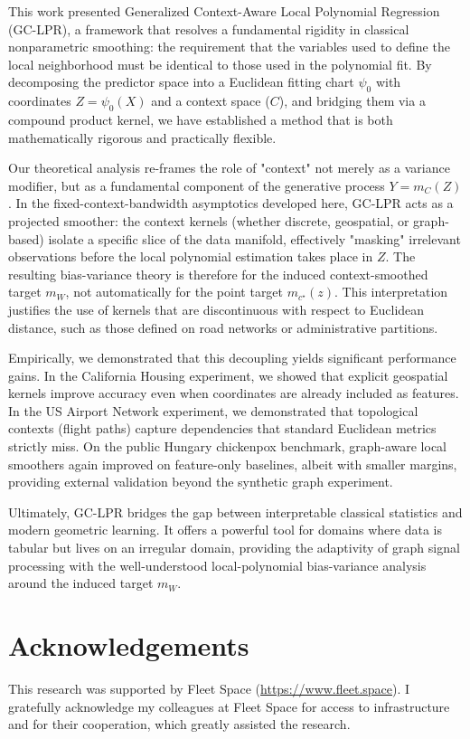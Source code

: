 \documentclass[final,1p,times,authoryear]{elsarticle}
\begin{document}
This work presented Generalized Context-Aware Local Polynomial Regression (GC-LPR), a framework that resolves a fundamental rigidity in classical nonparametric smoothing: the requirement that the variables used to define the local neighborhood must be identical to those used in the polynomial fit. By decomposing the predictor space into a Euclidean fitting chart $\psi_0$ with coordinates $Z=\psi_0(X)$ and a context space ($C$), and bridging them via a compound product kernel, we have established a method that is both mathematically rigorous and practically flexible.

Our theoretical analysis re-frames the role of "context" not merely as a variance modifier, but as a fundamental component of the generative process $Y = m_C(Z)$. In the fixed-context-bandwidth asymptotics developed here, GC-LPR acts as a projected smoother: the context kernels (whether discrete, geospatial, or graph-based) isolate a specific slice of the data manifold, effectively "masking" irrelevant observations before the local polynomial estimation takes place in $Z$. The resulting bias-variance theory is therefore for the induced context-smoothed target $m_W$, not automatically for the point target $m_{c^\star}(z)$. This interpretation justifies the use of kernels that are discontinuous with respect to Euclidean distance, such as those defined on road networks or administrative partitions.

Empirically, we demonstrated that this decoupling yields significant performance gains. In the California Housing experiment, we showed that explicit geospatial kernels improve accuracy even when coordinates are already included as features. In the US Airport Network experiment, we demonstrated that topological contexts (flight paths) capture dependencies that standard Euclidean metrics strictly miss. On the public Hungary chickenpox benchmark, graph-aware local smoothers again improved on feature-only baselines, albeit with smaller margins, providing external validation beyond the synthetic graph experiment.

Ultimately, GC-LPR bridges the gap between interpretable classical statistics and modern geometric learning. It offers a powerful tool for domains where data is tabular but lives on an irregular domain, providing the adaptivity of graph signal processing with the well-understood local-polynomial bias-variance analysis around the induced target $m_W$.

\section*{Acknowledgements}
This research was supported by Fleet Space (\url{https://www.fleet.space}). I gratefully acknowledge my colleagues at Fleet Space for access to infrastructure and for their cooperation, which greatly assisted the research.
\end{document}
